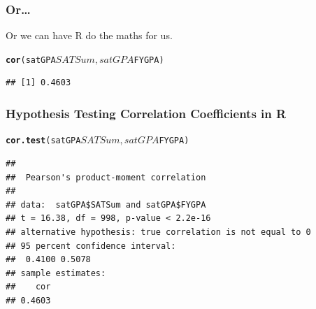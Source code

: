\documentclass{beamer}\usepackage{graphicx, color}
\makeatletter
\newcommand{\hlfunctioncall}[1]{\textcolor[rgb]{0.501960784313725,0,0.329411764705882}{\textbf{#1}}}%
\newenvironment{kframe}{%
 \def\at@end@of@kframe{}%
 \ifinner\ifhmode%
  \def\at@end@of@kframe{\end{minipage}}%
  \begin{minipage}{\columnwidth}%
 \fi\fi%
 \def\FrameCommand##1{\hskip\@totalleftmargin \hskip-\fboxsep
 \colorbox{shadecolor}{##1}\hskip-\fboxsep
     \hskip-\linewidth \hskip-\@totalleftmargin \hskip\columnwidth}%
 \MakeFramed {\advance\hsize-\width
   \@totalleftmargin\z@ \linewidth\hsize
   \@setminipage}}%
 {\par\unskip\endMakeFramed%
 \at@end@of@kframe}
\newenvironment{knitrout}{}{} %
\makeatother
\begin{document}
\begin{frame}[fragile]
  \frametitle{Or\ldots}
  Or we can have R do the maths for us.
\begin{knitrout}
\color{fgcolor}\begin{kframe}
\begin{alltt}
\hlfunctioncall{cor}(satGPA$SATSum, satGPA$FYGPA)
\end{alltt}
\begin{verbatim}
## [1] 0.4603
\end{verbatim}
\end{kframe}
\end{knitrout}

\end{frame}



\begin{frame}[fragile]
  \frametitle{Hypothesis Testing Correlation Coefficients in R}
\begin{knitrout}
\color{fgcolor}\begin{kframe}
\begin{alltt}
\hlfunctioncall{cor.test}(satGPA$SATSum, satGPA$FYGPA)
\end{alltt}
\begin{verbatim}
## 
## 	Pearson's product-moment correlation
## 
## data:  satGPA$SATSum and satGPA$FYGPA 
## t = 16.38, df = 998, p-value < 2.2e-16
## alternative hypothesis: true correlation is not equal to 0 
## 95 percent confidence interval:
##  0.4100 0.5078 
## sample estimates:
##    cor 
## 0.4603
\end{verbatim}
\end{kframe}
\end{knitrout}

\end{frame}
\end{document}

